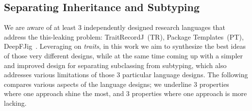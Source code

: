 \subsection{Separating Inheritance and Subtyping}
We are aware of at least 3 independently designed research languages 
that address the this-leaking problem: TraitRecordJ~(TR)\cite{Bettini:2010:ISP:1774088.1774530,BETTINI2013521,Bettini2015282}, Package Templates~(PT)\cite{KrogdahlMS09,DBLP:journals/taosd/AxelsenSKM12,DBLP:conf/gpce/AxelsenK12}, DeepFJig~\cite{deep,servetto2014meta,fjig}.
Leveraging on \emph{traits}, in this work we aim to synthesize
the best ideas of those very different designs, while at the same time 
coming up with a simpler and improved design for separating
subclassing from subtyping, which also addresses various limitations of those
3 particular language designs.
The following compares 
various aspects of the language designs;
we underline 3 properties where one approach shine the most, and 3 properties where one approach is more lacking.
